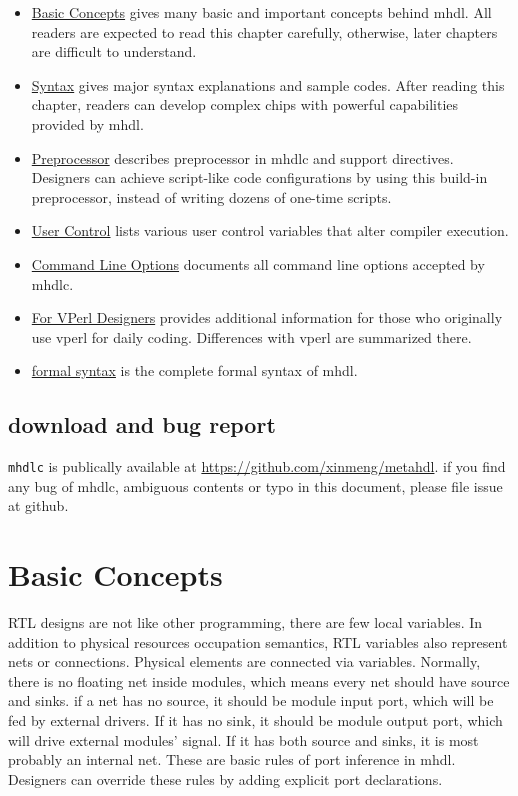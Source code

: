 \documentclass[10pt,oneside]{book}
\begin{document}
\begin{itemize}
\item \hyperref[sec:org0a37dbd]{Basic Concepts} gives many basic and important concepts behind
mhdl.  All readers are expected to read this chapter carefully,
otherwise, later chapters are difficult to understand.

\item \hyperref[sec:org7a8e6f7]{Syntax} gives major syntax explanations and sample codes. After
reading this chapter, readers can develop complex chips with
powerful capabilities provided by mhdl.

\item \hyperref[sec:orga49f1d8]{Preprocessor} describes preprocessor in mhdlc and support
directives. Designers can achieve script-like code configurations by
using this build-in preprocessor, instead of writing dozens of
one-time scripts.

\item \hyperref[sec:org17bead1]{User Control} lists various user control
variables that alter compiler execution.

\item \hyperref[sec:orgcd94bb9]{Command Line Options} documents all command line options accepted by
mhdlc.

\item \hyperref[sec:orgd4e6ee2]{For VPerl Designers} provides additional information for those who
originally use vperl for daily coding.
Differences with vperl are summarized there.

\item \hyperref[sec:orgbcbe461]{formal syntax} is the complete formal syntax of mhdl.
\end{itemize}

\section{download and bug report}
\label{sec:org525a051}
\texttt{mhdlc} is publically available at \url{https://github.com/xinmeng/metahdl}.
if you find any bug of mhdlc, ambiguous contents or typo in this
document, please file issue at github. 

\chapter{Basic Concepts}
\label{sec:org0a37dbd}
RTL designs are not like other programming, there are few local
variables.  In addition to physical resources occupation semantics,
RTL variables also represent nets or connections.  Physical elements
are connected via variables.  Normally, there is no floating net
inside modules, which means every net should have source and sinks.
if a net has no source, it should be module input port, which will be
fed by external drivers.  If it has no sink, it should be module
output port, which will drive external modules' signal.  If it has
both source and sinks, it is most probably an internal net.  These are
basic rules of port inference in mhdl.  Designers can override these
rules by adding explicit port declarations.
\end{document}
